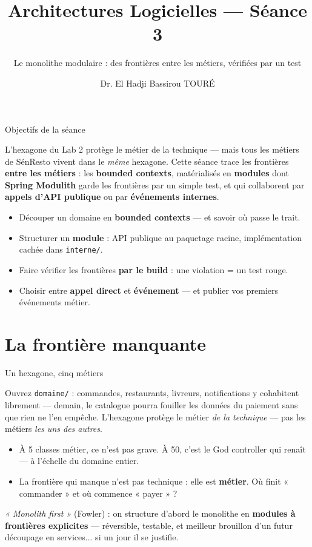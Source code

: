 \documentclass[aspectratio=169,11pt]{beamer}
\title{Architectures Logicielles — Séance 3}
\subtitle{Le monolithe modulaire : des frontières entre les métiers, vérifiées par un test}
\author{Dr. El Hadji Bassirou TOURÉ}
\institute{Département de Mathématiques et Informatique\\ Faculté des Sciences et Techniques\\ Université Cheikh Anta Diop de Dakar}
\date{}
\begin{document}
\begin{frame}\titlepage\end{frame}

\begin{frame}{Objectifs de la séance}
\begin{ucaddef}[Contenu]
{\small L'hexagone du Lab 2 protège le métier de la technique — mais tous les métiers de SénResto vivent dans le \emph{même} hexagone. Cette séance trace les frontières \textbf{entre les métiers} : les \textbf{bounded contexts}, matérialisés en \textbf{modules} dont \textbf{Spring Modulith} garde les frontières par un simple test, et qui collaborent par \textbf{appels d'API publique} ou par \textbf{événements internes}.}
\end{ucaddef}
\begin{itemize}\small
  \item Découper un domaine en \textbf{bounded contexts} — et savoir où passe le trait.
  \item Structurer un \textbf{module} : API publique au paquetage racine, implémentation cachée dans \texttt{interne/}.
  \item Faire vérifier les frontières \textbf{par le build} : une violation = un test rouge.
  \item Choisir entre \textbf{appel direct} et \textbf{événement} — et publier vos premiers événements métier.
\end{itemize}
\end{frame}

\section{La frontière manquante}

\begin{frame}{Un hexagone, cinq métiers}
\begin{ucadpiege}[Le constat]
{\small Ouvrez \texttt{domaine/} : commandes, restaurants, livreurs, notifications y cohabitent librement — demain, le catalogue pourra fouiller les données du paiement sans que rien ne l'en empêche. L'hexagone protège le métier \emph{de la technique} — pas les métiers \emph{les uns des autres}.}
\end{ucadpiege}
\begin{itemize}\small
  \item À 5 classes métier, ce n'est pas grave. À 50, c'est le God controller qui renaît — à l'échelle du domaine entier.
  \item La frontière qui manque n'est pas technique : elle est \textbf{métier}. Où finit « commander » et où commence « payer » ?
\end{itemize}
\begin{ucadret}
{\small \emph{« Monolith first »} (Fowler) : on structure d'abord le monolithe en \textbf{modules à frontières explicites} — réversible, testable, et meilleur brouillon d'un futur découpage en services... si un jour il se justifie.}
\end{ucadret}
\end{frame}
\end{document}
